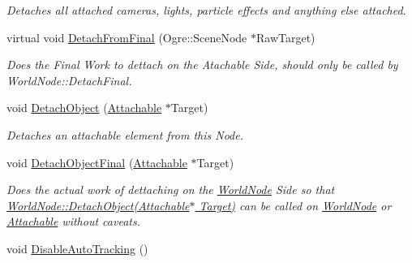 \begin{DoxyCompactItemize}
\begin{DoxyCompactList}\small\item\em Detaches all attached cameras, lights, particle effects and anything else attached. \item\end{DoxyCompactList}\item 
virtual void \hyperlink{classphys_1_1WorldNode_abab10f16b3d49c93a35443523cdb5a4f}{DetachFromFinal} (Ogre::SceneNode $\ast$RawTarget)
\begin{DoxyCompactList}\small\item\em Does the Final Work to dettach on the Atachable Side, should only be called by WorldNode::DetachFinal. \item\end{DoxyCompactList}\item 
void \hyperlink{classphys_1_1WorldNode_a15da2580dfbe1c684819d8783b3359ae}{DetachObject} (\hyperlink{classphys_1_1Attachable}{Attachable} $\ast$Target)
\begin{DoxyCompactList}\small\item\em Detaches an attachable element from this Node. \item\end{DoxyCompactList}\item 
void \hyperlink{classphys_1_1WorldNode_ae300db6515b782b165e77d19b7137851}{DetachObjectFinal} (\hyperlink{classphys_1_1Attachable}{Attachable} $\ast$Target)
\begin{DoxyCompactList}\small\item\em Does the actual work of dettaching on the \hyperlink{classphys_1_1WorldNode}{WorldNode} Side so that \hyperlink{classphys_1_1WorldNode_a15da2580dfbe1c684819d8783b3359ae}{WorldNode::DetachObject(Attachable$\ast$ Target)} can be called on \hyperlink{classphys_1_1WorldNode}{WorldNode} or \hyperlink{classphys_1_1Attachable}{Attachable} without caveats. \item\end{DoxyCompactList}\item 
\hypertarget{classphys_1_1WorldNode_aec20d9b24a8de76a227307a9d287d127}{
void \hyperlink{classphys_1_1WorldNode_aec20d9b24a8de76a227307a9d287d127}{DisableAutoTracking} ()}
\label{classphys_1_1WorldNode_aec20d9b24a8de76a227307a9d287d127}


\end{DoxyCompactItemize}

